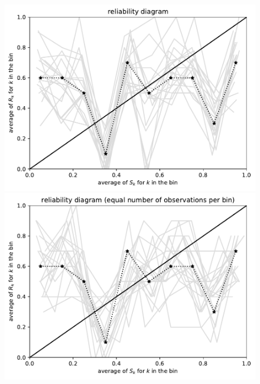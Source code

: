 \documentclass{article}
\begin{document}
\begin{figure}
\begin{centering}
\parbox{\imsize}{\includegraphics[width=\imsize]
                {./codes/unweighted/100_10_0_0/equiprob.pdf}}
\quad\quad
\parbox{\imsize}{\includegraphics[width=\imsize]
                {./codes/unweighted/100_10_0_0/equisamp.pdf}}

\vspace{\vertsep}


\end{centering}
\end{figure}
\end{document}
